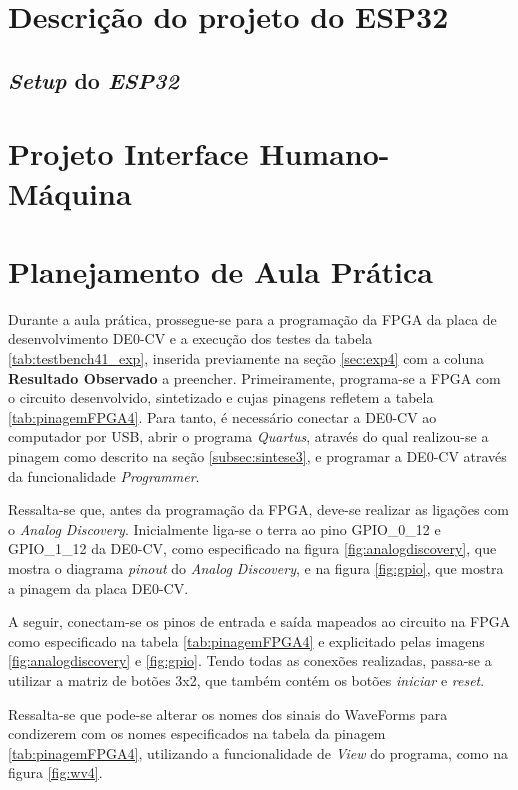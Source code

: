 \documentclass[amsmath,amssymb,floatfix]{report}
\begin{document}
\section{Descrição do projeto do ESP32}
\label{sec:esp32projetodescricao4}

\subsection{\textit{Setup} do \textit{ESP32}}
\label{subsec:arduinosetup4}

\section{Projeto Interface Humano-Máquina}
\label{sec:site4}

\section{Planejamento de Aula Prática}

Durante a aula prática, prossegue-se para a programação da FPGA da placa de desenvolvimento DE0-CV e a execução dos testes da tabela \ref{tab:testbench41_exp}, inserida previamente na seção \ref{sec:exp4} com a coluna \textbf{Resultado Observado} a preencher. Primeiramente, programa-se a FPGA com o circuito desenvolvido, sintetizado e cujas pinagens refletem a tabela \ref{tab:pinagemFPGA4}. Para tanto, é necessário conectar a DE0-CV ao computador por USB, abrir o programa \textit{Quartus}, através do qual realizou-se a pinagem como descrito na seção \ref{subsec:sintese3}, e programar a DE0-CV através da funcionalidade \textit{Programmer}. 

Ressalta-se que, antes da programação da FPGA, deve-se realizar as ligações com o \textit{Analog Discovery}. Inicialmente liga-se o terra ao pino GPIO\_0\_12 e GPIO\_1\_12 da DE0-CV, como especificado na figura \ref{fig:analogdiscovery}, que mostra o diagrama \textit{pinout} do \textit{Analog Discovery}, e na figura \ref{fig:gpio}, que mostra a pinagem da placa DE0-CV.

A seguir, conectam-se os pinos de entrada e saída mapeados ao circuito na FPGA como especificado na tabela \ref{tab:pinagemFPGA4} e explicitado pelas imagens \ref{fig:analogdiscovery} e \ref{fig:gpio}. Tendo todas as conexões realizadas, passa-se a utilizar a matriz de botões 3x2, que também contém os botões \textit{iniciar} e \textit{reset}.

Ressalta-se que pode-se alterar os nomes dos sinais do WaveForms para condizerem com os nomes especificados na tabela da pinagem \ref{tab:pinagemFPGA4}, utilizando a funcionalidade de \textit{View} do programa, como na figura \ref{fig:wv4}.
\end{document}
